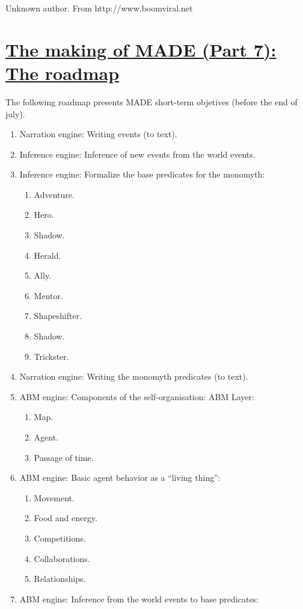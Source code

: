 \documentclass[a4paper]{article}
\newcommand\liststyleLx{%
\renewcommand\theenumi{\arabic{enumi}}
\renewcommand\theenumii{\arabic{enumii}}
\renewcommand\theenumiii{\arabic{enumiii}}
\renewcommand\theenumiv{\arabic{enumiv}}
\renewcommand\labelenumi{\theenumi.}
\renewcommand\labelenumii{\theenumii.}
\renewcommand\labelenumiii{\theenumiii.}
\renewcommand\labelenumiv{\theenumiv.}
}
\begin{document}
Unknown author. From http://www.boomviral.net


\bigskip

\clearpage\section[The making of MADE (Part 7): The
roadmap]{\href{http://www.velonuboso.com/made/2015/06/27/making-part-7-roadmap/}{The
making of MADE (Part 7): The roadmap}}
The following roadmap presents MADE short-term objetives (before the end
of july).

\liststyleLx
\begin{enumerate}
\item Narration engine: Writing events (to text). 
\item Inference engine: Inference of new events from the world events. 
\item Inference engine: Formalize the base predicates for the monomyth: 

\begin{enumerate}
\item Adventure. 
\item Hero. 
\item Shadow. 
\item Herald. 
\item Ally. 
\item Mentor. 
\item Shapeshifter. 
\item Shadow. 
\item Trickster. 
\end{enumerate}
\item Narration engine: Writing the monomyth predicates (to text). 
\item ABM engine: Components of the self-organisation: ABM Layer: 

\begin{enumerate}
\item Map. 
\item Agent. 
\item Passage of time. 
\end{enumerate}
\item ABM engine: Basic agent behavior as a {\textquotedblleft}living
thing{\textquotedblright}: 

\begin{enumerate}
\item Movement. 
\item Food and energy. 
\item Competitions. 
\item Collaborations. 
\item Relationships. 
\end{enumerate}
\item ABM engine: Inference from the world events to base predicates: 


\end{enumerate}
\end{document}

